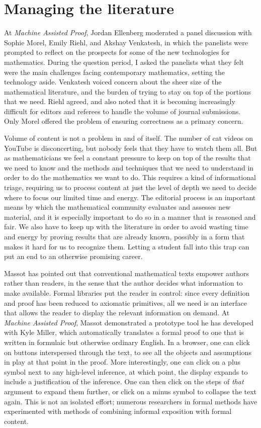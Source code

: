 \documentclass[12pt]{amsart}
\theoremstyle{definition}
\theoremstyle{remark}
\numberwithin{equation}{section}
\begin{document}
\section{Managing the literature}

At \emph{Machine Assisted Proof}, Jordan Ellenberg moderated a panel discussion with Sophie Morel, Emily Riehl, and Akshay Venkatesh, in which the panelists were prompted to reflect on the prospects for some of the new technologies for mathematics. During the question period, I asked the panelists what they felt were the main challenges facing contemporary mathematics, setting the technology aside. Venkatesh voiced concern about the sheer size of the mathematical literature, and the burden of trying to stay on top of the portions that we need. Riehl agreed, and also noted that it is becoming increasingly difficult for editors and referees to handle the volume of journal submissions. Only Morel offered the problem of ensuring correctness as a primary concern.

Volume of content is not a problem in and of itself. The number of cat videos on YouTube is disconcerting, but nobody feels that they have to watch them all. But as mathematicians we feel a constant pressure to keep on top of the results that we need to know and the methods and techniques that we need to understand in order to do the mathematics we want to do. This requires a kind of informational triage, requiring us to process content at just the level of depth we need to decide where to focus our limited time and energy. The editorial process is an important means by which the mathematical community evaluates and assesses new material, and it is especially important to do so in a manner that is reasoned and fair. We also have to keep up with the literature in order to avoid wasting time and energy by proving results that are already known, possibly in a form that makes it hard for us to recognize them. Letting a student fall into this trap can put an end to an otherwise promising career.

Massot has pointed out that conventional mathematical texts empower authors rather than readers, in the sense that the author decides what information to make available. Formal libraries put the reader in control: since every definition and proof has been reduced to axiomatic primitives, all we need is an interface that allows the reader to display the relevant information on demand. At \emph{Machine Assisted Proof}, Massot demonstrated a prototype tool he has developed with Kyle Miller, which automatically translates a formal proof to one that is written in formulaic but otherwise ordinary English. In a browser, one can click on buttons interspersed through the text, to see all the objects and assumptions in play at that point in the proof. More interestingly, one can click on a plus symbol next to any high-level inference, at which point, the display expands to include a justification of the inference. One can then click on the steps of \emph{that} argument to expand them further, or click on a minus symbol to collapse the text again. This is not an isolated effort; numerous researchers in formal methods have experimented with methods of combining informal exposition with formal content.
\end{document}

